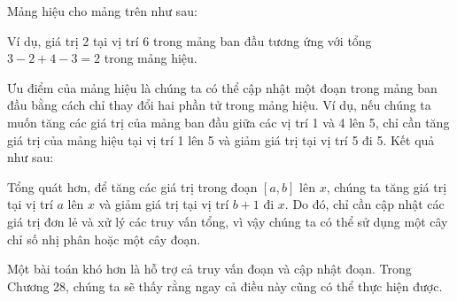 Mảng hiệu cho mảng trên như sau:
\begin{center}
\end{center}

Ví dụ, giá trị 2 tại vị trí 6 trong mảng ban đầu
tương ứng với tổng $3-2+4-3=2$ trong mảng hiệu.

Ưu điểm của mảng hiệu là
chúng ta có thể cập nhật một đoạn
trong mảng ban đầu bằng cách chỉ thay đổi
hai phần tử trong mảng hiệu.
Ví dụ, nếu chúng ta muốn
tăng các giá trị của mảng ban đầu
giữa các vị trí 1 và 4 lên 5,
chỉ cần tăng
giá trị của mảng hiệu tại vị trí 1 lên 5
và giảm giá trị tại vị trí 5 đi 5.
Kết quả như sau:

\begin{center}
\end{center}

Tổng quát hơn, để tăng các giá trị
trong đoạn $[a,b]$ lên $x$,
chúng ta tăng giá trị tại vị trí $a$ lên $x$
và giảm giá trị tại vị trí $b+1$ đi $x$.
Do đó, chỉ cần cập nhật các giá trị đơn lẻ
và xử lý các truy vấn tổng,
vì vậy chúng ta có thể sử dụng một cây chỉ số nhị phân hoặc một cây đoạn.

Một bài toán khó hơn là hỗ trợ cả
truy vấn đoạn và cập nhật đoạn.
Trong Chương 28, chúng ta sẽ thấy rằng ngay cả điều này cũng có thể thực hiện được.